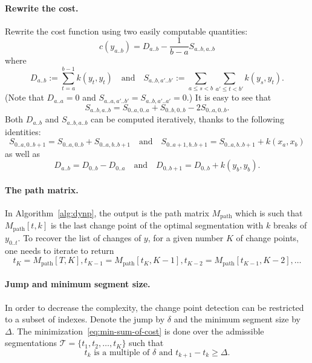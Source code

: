 \documentclass[12pt]{article}
\newcommand{\TT}{\mathcal{T}}
\begin{document}
\paragraph{Rewrite the cost.}
Rewrite the cost function using two easily computable quantities:
\begin{equation}
    c(y_{a..b}) = D_{a..b} - \frac{1}{b-a} S_{a..b, a..b}
\end{equation}
where
\begin{equation}
    D_{a..b} := \sum_{t=a}^{b-1} k(y_t, y_t) \quad\text{and}\quad S_{a..b, a'..b'} := \sum_{a\leq s <b} \sum_{a'\leq t <b'} k(y_s, y_t).
\end{equation}
(Note that $D_{a..a}=0$ and $S_{a..a, a'..b'}=S_{a..b, a'..a'}=0$.)
It is easy to see that
\begin{equation}
    S_{a..b, a..b} = S_{0..a, 0..a} + S_{0..b, 0..b} - 2S_{0..a, 0..b}.
\end{equation}
Both $D_{a..b}$ and $S_{a..b, a..b}$ can be computed iteratively, thanks to the following identities:
\begin{equation}
    S_{0..a, 0..b+1} = S_{0..a, 0..b} + S_{0..a, b..b+1}\quad\text{and}\quad S_{0..a+1, b..b+1} = S_{0..a, b..b+1} + k(x_a, x_b)
\end{equation}
as well as
\begin{equation}
    D_{a..b} = D_{0..b} - D_{0..a}\quad\text{and}\quad D_{0..b+1} = D_{0..b} + k(y_b, y_b).
\end{equation}

\paragraph{The path matrix.}
In Algorithm~\ref{alg:dynp}, the output is the path matrix $M_{\text{path}}$ which is such that $M_{\text{path}}[t, k]$ is the last change point of the optimal segmentation with $k$ breaks of $y_{0..t}$.
To recover the list of changes of $y$, for a given number $K$ of change points, one needs to iterate to return
\begin{equation*}
    t_K = M_{\text{path}}[T, K], t_{K-1}=M_{\text{path}}[t_K, K-1], t_{K-2}=M_{\text{path}}[t_{K-1}, K-2], \dots
\end{equation*}

\paragraph{Jump and minimum segment size.}
In order to decrease the complexity, the change point detection can be restricted to a subset of indexes.
Denote the jump by $\delta$ and the minimum segment size by $\Delta$.
The minimization~\eqref{eq:min-sum-of-cost} is done over the admissible segmentations $\TT=\{t_1,t_2,\dots,t_K\}$ such that
\begin{equation}
    t_k \text{ is a multiple of }\delta\text{ and } t_{k+1}-t_k \geq \Delta.
\end{equation}
\end{document}
